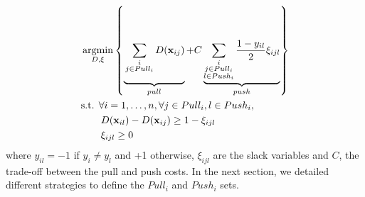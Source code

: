 \begin{equation}
\begin{aligned}
&\displaystyle 		\argmin_{D,\xi} \left\lbrace \underbrace{
	\vphantom{ \sum\limits_{\substack{i \\ j \in Pull_i \\ l \in Push_i}} \frac{1-y_{il}}{2} \xi_{ijl} }
	\sum_{\substack{i \\ j \in Pull_i}}D(\textbf{x}_{ij})
}_{pull}
+ C
\underbrace{
	\sum\limits_{\substack{i \\ j \in Pull_i \\ l \in Push_i}} \frac{1-y_{il}}{2} \xi_{ijl}
}
_{push} \right\rbrace  \\
&\text{s.t.  } \forall i = 1, \ldots, n, \forall j \in Pull_i, l \in Push_i, \\
& \qquad D(\textbf{x}_{il})-D(\textbf{x}_{ij}) \geq 1-\xi_{ijl} \\
& \qquad \xi_{ijl} \geq 0 
\label{eq:OriginalOptimizationProblem_Objective} 
\end{aligned}
\end{equation}
\noindent where $y_{il} = -1$ if $y_i \neq y_l$ and +1 otherwise, $\xi_{ijl}$ are the slack variables and $C$, the trade-off between the pull and push costs. In the next section, we detailed different strategies to define the $Pull_i$ and $Push_i$ sets. 


